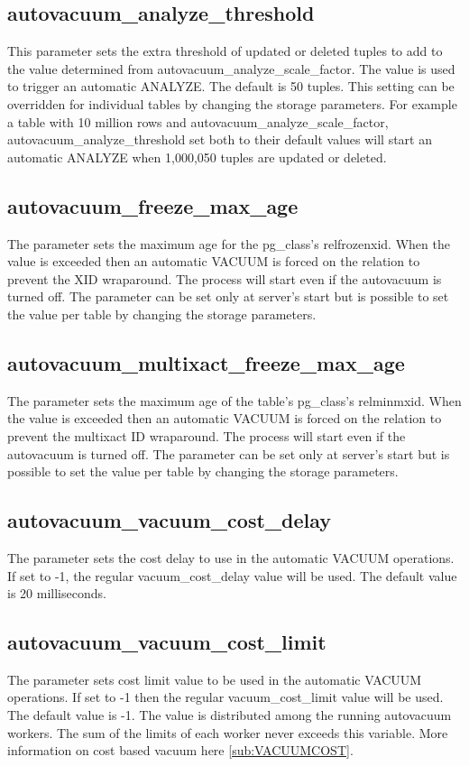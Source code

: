 \subsection{autovacuum\_analyze\_threshold}
This parameter sets the extra threshold of updated or deleted tuples to add to the value determined from
autovacuum\_analyze\_scale\_factor. The value is used to  trigger an automatic ANALYZE. The default is 50
tuples. This setting can be overridden for individual tables by changing the storage parameters. For
example a
table with 10 million rows and autovacuum\_analyze\_scale\_factor, autovacuum\_analyze\_threshold set both
to their default values will start an automatic ANALYZE when 1,000,050 tuples are updated or deleted.

\subsection{autovacuum\_freeze\_max\_age}
The parameter sets the maximum age for the pg\_class's relfrozenxid. When the value is exceeded then an
automatic VACUUM is forced on the relation to prevent the XID wraparound. The process will start
even if the autovacuum is turned off. The parameter can be set only at server's start but is possible to
set the value per table by changing the storage parameters.

\subsection{autovacuum\_multixact\_freeze\_max\_age}
The parameter sets the maximum age of the table's pg\_class's relminmxid. When the value is exceeded then
an automatic VACUUM is forced on the relation to prevent the  multixact ID wraparound. The process will
start even if the autovacuum is turned off. The parameter can be set only at server's start but is possible
to set the value per table by changing the storage parameters.

\subsection{autovacuum\_vacuum\_cost\_delay}
The parameter sets the cost delay to use in the automatic VACUUM operations. If set to -1, the regular
vacuum\_cost\_delay value will be used. The default value is 20 milliseconds.

\subsection{autovacuum\_vacuum\_cost\_limit}
The parameter sets  cost limit value to be used in the automatic VACUUM operations. If set to -1 then the
regular vacuum\_cost\_limit value will be used. The default value is -1. The value is distributed among the
running autovacuum workers. The sum of the limits of each worker never exceeds this variable. More
information on cost based vacuum here \ref{sub:VACUUMCOST}.



